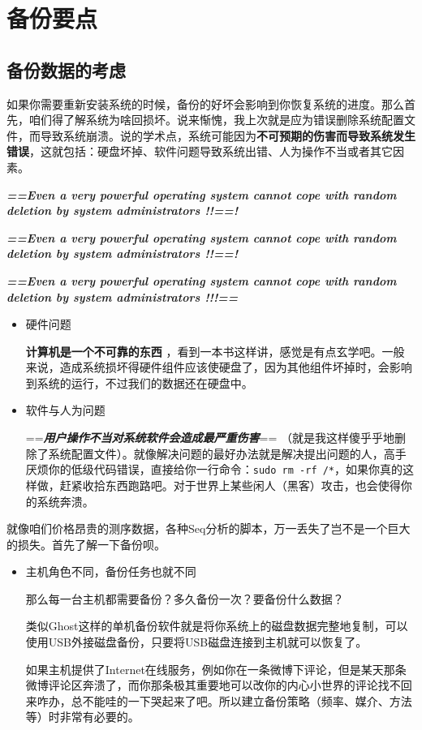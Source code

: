 \documentclass[
]{book}
\begin{document}
\hypertarget{ux5907ux4efdux8981ux70b9}{%
\section{备份要点}\label{ux5907ux4efdux8981ux70b9}}

\hypertarget{ux5907ux4efdux6570ux636eux7684ux8003ux8651}{%
\subsection{备份数据的考虑}\label{ux5907ux4efdux6570ux636eux7684ux8003ux8651}}

如果你需要重新安装系统的时候，备份的好坏会影响到你恢复系统的进度。那么首先，咱们得了解系统为啥回损坏。说来惭愧，我上次就是应为错误删除系统配置文件，而导致系统崩溃。说的学术点，系统可能因为\textbf{不可预期的伤害而导致系统发生错误}，这就包括：硬盘坏掉、软件问题导致系统出错、人为操作不当或者其它因素。

\textbf{\emph{==Even a very powerful operating system cannot cope with random deletion by system administrators !!==!}}

\textbf{\emph{==Even a very powerful operating system cannot cope with random deletion by system administrators !!==!}}

\textbf{\emph{==Even a very powerful operating system cannot cope with random deletion by system administrators !!!==}}

\begin{itemize}
\item
  硬件问题

  \textbf{计算机是一个不可靠的东西} ，看到一本书这样讲，感觉是有点玄学吧。一般来说，造成系统损坏得硬件组件应该使硬盘了，因为其他组件坏掉时，会影响到系统的运行，不过我们的数据还在硬盘中。
\item
  软件与人为问题

  ==\textbf{\emph{用户操作不当对系统软件会造成最严重伤害}}== （就是我这样傻乎乎地删除了系统配置文件）。就像解决问题的最好办法就是解决提出问题的人，高手厌烦你的低级代码错误，直接给你一行命令：\texttt{sudo\ rm\ -rf\ /*}，如果你真的这样做，赶紧收拾东西跑路吧。对于世界上某些闲人（黑客）攻击，也会使得你的系统奔溃。
\end{itemize}

就像咱们价格昂贵的测序数据，各种Seq分析的脚本，万一丢失了岂不是一个巨大的损失。首先了解一下备份呗。

\begin{itemize}
\item
  主机角色不同，备份任务也就不同

  那么每一台主机都需要备份？多久备份一次？要备份什么数据？

  类似Ghost这样的单机备份软件就是将你系统上的磁盘数据完整地复制，可以使用USB外接磁盘备份，只要将USB磁盘连接到主机就可以恢复了。

  如果主机提供了Internet在线服务，例如你在一条微博下评论，但是某天那条微博评论区奔溃了，而你那条极其重要地可以改你的内心小世界的评论找不回来咋办，总不能哇的一下哭起来了吧。所以建立备份策略（频率、媒介、方法等）时非常有必要的。
\end{itemize}
\end{document}
